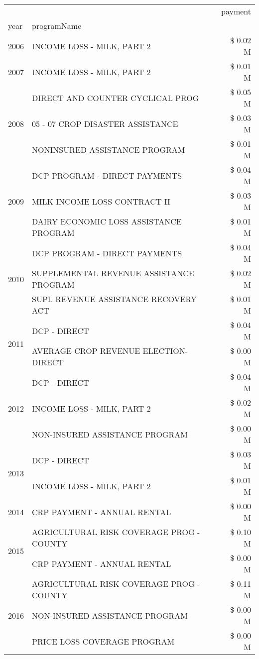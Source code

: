 \begin{tabular}{llr}
\toprule
 &  & payment \\
year & programName &  \\
\midrule
2006 & INCOME LOSS - MILK, PART 2 & \$ 0.02 M \\
\cline{1-3}
2007 & INCOME LOSS - MILK, PART 2 & \$ 0.01 M \\
\cline{1-3}
\multirow[t]{3}{*}{2008} & DIRECT AND COUNTER CYCLICAL PROG & \$ 0.05 M \\
 & 05 - 07 CROP DISASTER ASSISTANCE & \$ 0.03 M \\
 & NONINSURED ASSISTANCE PROGRAM & \$ 0.01 M \\
\cline{1-3}
\multirow[t]{3}{*}{2009} & DCP PROGRAM - DIRECT PAYMENTS & \$ 0.04 M \\
 & MILK INCOME LOSS CONTRACT II & \$ 0.03 M \\
 & DAIRY ECONOMIC LOSS ASSISTANCE PROGRAM & \$ 0.01 M \\
\cline{1-3}
\multirow[t]{3}{*}{2010} & DCP PROGRAM - DIRECT PAYMENTS & \$ 0.04 M \\
 & SUPPLEMENTAL REVENUE ASSISTANCE PROGRAM & \$ 0.02 M \\
 & SUPL REVENUE ASSISTANCE RECOVERY ACT & \$ 0.01 M \\
\cline{1-3}
\multirow[t]{2}{*}{2011} & DCP - DIRECT & \$ 0.04 M \\
 & AVERAGE CROP REVENUE ELECTION-DIRECT & \$ 0.00 M \\
\cline{1-3}
\multirow[t]{3}{*}{2012} & DCP - DIRECT & \$ 0.04 M \\
 & INCOME LOSS - MILK, PART 2 & \$ 0.02 M \\
 & NON-INSURED ASSISTANCE PROGRAM & \$ 0.00 M \\
\cline{1-3}
\multirow[t]{2}{*}{2013} & DCP - DIRECT & \$ 0.03 M \\
 & INCOME LOSS - MILK, PART 2 & \$ 0.01 M \\
\cline{1-3}
2014 & CRP PAYMENT - ANNUAL RENTAL & \$ 0.00 M \\
\cline{1-3}
\multirow[t]{2}{*}{2015} & AGRICULTURAL RISK COVERAGE PROG - COUNTY & \$ 0.10 M \\
 & CRP PAYMENT - ANNUAL RENTAL & \$ 0.00 M \\
\cline{1-3}
\multirow[t]{3}{*}{2016} & AGRICULTURAL RISK COVERAGE PROG - COUNTY & \$ 0.11 M \\
 & NON-INSURED ASSISTANCE PROGRAM & \$ 0.00 M \\
 & PRICE LOSS COVERAGE PROGRAM & \$ 0.00 M \\

\end{tabular}
